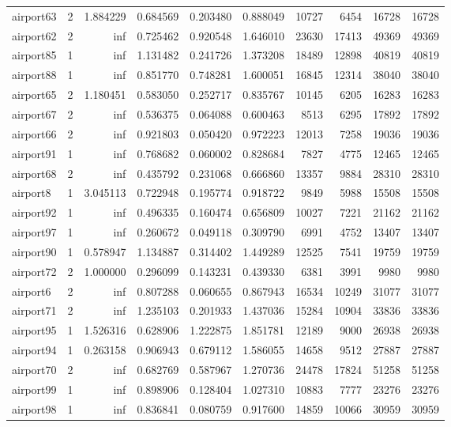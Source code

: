 \begin{longtable}{|l|r|r|r|r|r|r|r|r|r|}
airport63 & 2 & 1.884229 & 0.684569 & 0.203480 & 0.888049 & 10727 & 6454 & 16728 & 16728 \\
airport62 & 2 & inf & 0.725462 & 0.920548 & 1.646010 & 23630 & 17413 & 49369 & 49369 \\
airport85 & 1 & inf & 1.131482 & 0.241726 & 1.373208 & 18489 & 12898 & 40819 & 40819 \\
airport88 & 1 & inf & 0.851770 & 0.748281 & 1.600051 & 16845 & 12314 & 38040 & 38040 \\
airport65 & 2 & 1.180451 & 0.583050 & 0.252717 & 0.835767 & 10145 & 6205 & 16283 & 16283 \\
airport67 & 2 & inf & 0.536375 & 0.064088 & 0.600463 & 8513 & 6295 & 17892 & 17892 \\
airport66 & 2 & inf & 0.921803 & 0.050420 & 0.972223 & 12013 & 7258 & 19036 & 19036 \\
airport91 & 1 & inf & 0.768682 & 0.060002 & 0.828684 & 7827 & 4775 & 12465 & 12465 \\
airport68 & 2 & inf & 0.435792 & 0.231068 & 0.666860 & 13357 & 9884 & 28310 & 28310 \\
airport8 & 1 & 3.045113 & 0.722948 & 0.195774 & 0.918722 & 9849 & 5988 & 15508 & 15508 \\
airport92 & 1 & inf & 0.496335 & 0.160474 & 0.656809 & 10027 & 7221 & 21162 & 21162 \\
airport97 & 1 & inf & 0.260672 & 0.049118 & 0.309790 & 6991 & 4752 & 13407 & 13407 \\
airport90 & 1 & 0.578947 & 1.134887 & 0.314402 & 1.449289 & 12525 & 7541 & 19759 & 19759 \\
airport72 & 2 & 1.000000 & 0.296099 & 0.143231 & 0.439330 & 6381 & 3991 & 9980 & 9980 \\
airport6 & 2 & inf & 0.807288 & 0.060655 & 0.867943 & 16534 & 10249 & 31077 & 31077 \\
airport71 & 2 & inf & 1.235103 & 0.201933 & 1.437036 & 15284 & 10904 & 33836 & 33836 \\
airport95 & 1 & 1.526316 & 0.628906 & 1.222875 & 1.851781 & 12189 & 9000 & 26938 & 26938 \\
airport94 & 1 & 0.263158 & 0.906943 & 0.679112 & 1.586055 & 14658 & 9512 & 27887 & 27887 \\
airport70 & 2 & inf & 0.682769 & 0.587967 & 1.270736 & 24478 & 17824 & 51258 & 51258 \\
airport99 & 1 & inf & 0.898906 & 0.128404 & 1.027310 & 10883 & 7777 & 23276 & 23276 \\
airport98 & 1 & inf & 0.836841 & 0.080759 & 0.917600 & 14859 & 10066 & 30959 & 30959 \\

\end{longtable}
